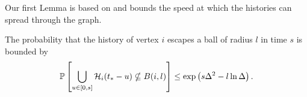 


	Our first Lemma is based on \cite[Lemma 2.1]{Lubetzky2016-wd} and bounds the speed at which the histories can spread through the graph.
	\begin{lemma}
	\label{lem:prob history contained in ball}
		The probability that the history of vertex $i$ escapes a ball of radius $l$ in time $s$ is bounded by
		\begin{equation}
			\mathbb{P}\left[\bigcup_{u \in [0, s]}\mathcal{H}_i(t_* - u) \nsubseteq B(i, l)\right] \leq \exp\left(s \Delta^2 - l \ln \Delta \right).
		\end{equation}
	\end{lemma}
